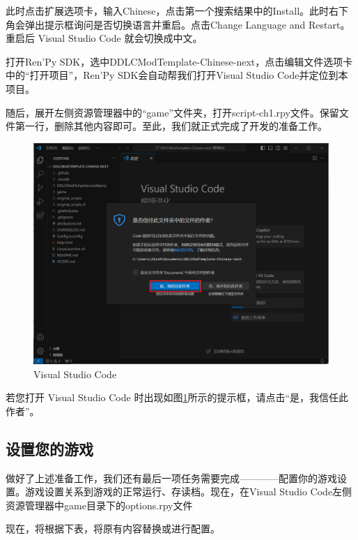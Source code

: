 此时点击扩展选项卡，输入Chinese，点击第一个搜索结果中的Install。此时右下角会弹出提示框询问是否切换语言并重启。点击Change Language and Restart。重启后 Visual Studio Code 就会切换成中文。

打开Ren'Py SDK，选中DDLCModTemplate-Chinese-next，点击编辑文件选项卡中的“打开项目”，Ren'Py SDK会自动帮我们打开Visual Studio Code并定位到本项目。

随后，展开左侧资源管理器中的“game”文件夹，打开script-ch1.rpy文件。保留文件第一行，删除其他内容即可。至此，我们就正式完成了开发的准备工作。

\begin{figure}[htbp]
    \centering
    \includegraphics[scale=.4]{Pictures/2/2.2/2.2.1}
    \caption{Visual Studio Code}
    \label{fig:2.4}
\end{figure}

\begin{Comment}
    若您打开 Visual Studio Code 时出现如图\ref{fig:2.4}所示的提示框，请点击“是，我信任此作者”。
\end{Comment}

\subsection{设置您的游戏}
做好了上述准备工作，我们还有最后一项任务需要完成————配置你的游戏设置。游戏设置关系到游戏的正常运行、存读档。现在，在Visual Studio Code左侧资源管理器中game目录下的options.rpy文件

现在，将根据下表，将原有内容替换或进行配置。



